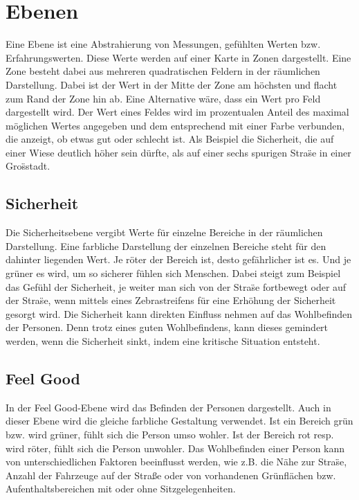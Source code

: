 \documentclass[10pt]{scrartcl}
\begin{document}
	 

\section{Ebenen}
Eine Ebene ist eine Abstrahierung von Messungen, gef\"uhlten Werten bzw. Erfahrungswerten. Diese Werte werden auf einer Karte in Zonen dargestellt. Eine Zone besteht dabei aus mehreren quadratischen Feldern in der r\"aumlichen Darstellung. Dabei ist der Wert in der Mitte der Zone am h\"ochsten und flacht zum Rand der Zone hin ab. Eine Alternative w\"are, dass ein Wert pro Feld dargestellt wird.
\newline Der Wert eines Feldes wird im prozentualen Anteil des maximal m\"oglichen Wertes angegeben und dem entsprechend mit einer Farbe verbunden, die anzeigt, ob etwas gut oder schlecht ist. Als Beispiel die Sicherheit, die auf einer Wiese deutlich h\"oher sein d\"urfte, als auf einer sechs spurigen Stra\"se in einer Gro\"sstadt.

\subsection{Sicherheit}
Die Sicherheitsebene vergibt Werte f\"ur einzelne Bereiche in der r\"aumlichen Darstellung. Eine farbliche Darstellung der einzelnen Bereiche steht f\"ur den dahinter liegenden Wert. Je r\"oter der Bereich ist, desto gef\"ahrlicher ist es. Und je gr\"uner es wird, um so sicherer f\"uhlen sich Menschen. Dabei steigt zum Beispiel das Gef\"uhl der Sicherheit, je weiter man sich von der Stra\"se fortbewegt oder auf der Stra\"se, wenn mittels eines Zebrastreifens f\"ur eine Erh\"ohung der Sicherheit gesorgt wird.
\newline Die Sicherheit kann direkten Einfluss nehmen auf das Wohlbefinden der Personen. Denn trotz eines guten Wohlbefindens, kann dieses gemindert werden, wenn die Sicherheit sinkt, indem eine kritische Situation entsteht.

\subsection{Feel Good}
In der Feel Good-Ebene wird das Befinden der Personen dargestellt. Auch in dieser Ebene wird die gleiche farbliche Gestaltung verwendet. Ist ein Bereich gr\"un bzw. wird gr\"uner, f\"uhlt sich die Person umso wohler. Ist der Bereich rot resp. wird r\"oter, f\"uhlt sich die Person unwohler. Das Wohlbefinden einer Person kann von unterschiedlichen Faktoren beeinflusst werden, wie z.B. die N\"ahe zur Stra\"se, Anzahl der Fahrzeuge auf der Straße oder von vorhandenen Gr\"unfl\"achen bzw. Aufenthaltsbereichen mit oder ohne Sitzgelegenheiten.
\end{document}
